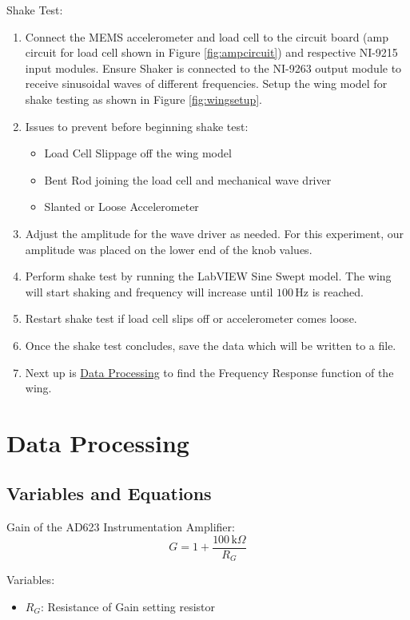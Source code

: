 \documentclass{article}
\begin{document}
Shake Test:
\begin{enumerate}
    \item Connect the MEMS accelerometer and load cell to the circuit board (amp circuit for load cell shown in Figure \ref{fig:ampcircuit}) and respective NI-9215 input modules. Ensure Shaker is connected to the NI-9263 output module to receive sinusoidal waves of different frequencies. Setup the wing model for shake testing as shown in Figure \ref{fig:wingsetup}.
    \item Issues to prevent before beginning shake test:
    \begin{itemize}
        \item Load Cell Slippage off the wing model
        \item Bent Rod joining the load cell and mechanical wave driver
        \item Slanted or Loose Accelerometer
    \end{itemize}
    \item Adjust the amplitude for the wave driver as needed. For this experiment, our amplitude was placed on the lower end of the knob values.
    \item Perform shake test by running the LabVIEW Sine Swept model. The wing will start shaking and frequency will increase until $100\, \text{Hz}$ is reached.
    \item Restart shake test if load cell slips off or accelerometer comes loose. 
    \item Once the shake test concludes, save the data which will be written to a file.
    \item Next up is \hyperlink{datapro}{Data Processing} to find the Frequency Response function of the wing.
\end{enumerate}

\hypertarget{datapro}{}
\section{Data Processing}
\subsection{Variables and Equations}  

Gain of the AD623 Instrumentation Amplifier:
\begin{equation}
    G = 1 + \dfrac{100\, \text{k}\Omega}{R_{G}}
\end{equation}

Variables:
\begin{itemize}
    \item \(R_{G}\): Resistance of Gain setting resistor
\end{itemize}
\vspace{5mm}
\end{document}
